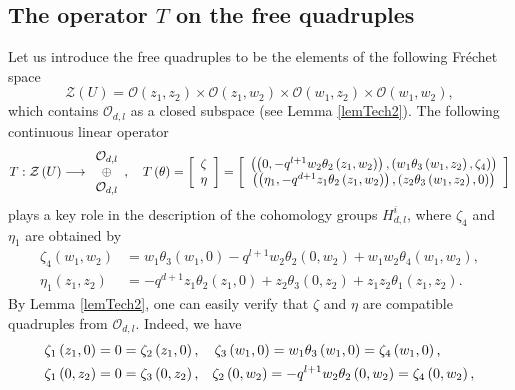\documentclass[12pt,reqno]{amsart}%
\theoremstyle{plain}
\numberwithin{theorem}{section} \numberwithin{equation}{section}
\numberwithin{lemma}{section}
\numberwithin{remark}{section}
\numberwithin{example}{section}
\numberwithin{proposition}{section}
\numberwithin{definition}{section}
\numberwithin{corollary}{section}
\begin{document}
\subsection{The operator $T$ on the free quadruples\label{subsecOT}}

Let us introduce the free quadruples to be the elements of the following
Fr\'{e}chet space
\[
\mathcal{Z}\left(  U\right)  =\mathcal{O}\left(  z_{1},z_{2}\right)
\times\mathcal{O}\left(  z_{1},w_{2}\right)  \times\mathcal{O}\left(
w_{1},z_{2}\right)  \times\mathcal{O}\left(  w_{1},w_{2}\right)  ,
\]
which contains $\mathcal{O}_{d,l}$ as a closed subspace (see Lemma
\ref{lemTech2}). The following continuous linear operator
\[
T:\mathcal{Z}\left(  U\right)  \longrightarrow%
\begin{array}
[c]{c}%
\mathcal{O}_{d,l}\\
\oplus\\
\mathcal{O}_{d,l}%
\end{array}
,\quad T\left(  \theta\right)  =\left[
\begin{array}
[c]{c}%
\zeta\\
\eta
\end{array}
\right]  =\left[
\begin{array}
[c]{c}%
\left(  \left(  0,-q^{l+1}w_{2}\theta_{2}\left(  z_{1},w_{2}\right)  \right)
,\left(  w_{1}\theta_{3}\left(  w_{1},z_{2}\right)  ,\zeta_{4}\right)  \right)
\\
\left(  \left(  \eta_{1},-q^{d+1}z_{1}\theta_{2}\left(  z_{1},w_{2}\right)
\right)  ,\left(  z_{2}\theta_{3}\left(  w_{1},z_{2}\right)  ,0\right)
\right)
\end{array}
\right]
\]
plays a key role in the description of the cohomology groups $H_{d,l}^{i}$,
where $\zeta_{4}$ and $\eta_{1}$ are obtained by
\begin{align*}
\zeta_{4}\left(  w_{1},w_{2}\right)   &  =w_{1}\theta_{3}\left(
w_{1},0\right)  -q^{l+1}w_{2}\theta_{2}\left(  0,w_{2}\right)  +w_{1}%
w_{2}\theta_{4}\left(  w_{1},w_{2}\right)  ,\\
\eta_{1}\left(  z_{1},z_{2}\right)   &  =-q^{d+1}z_{1}\theta_{2}\left(
z_{1},0\right)  +z_{2}\theta_{3}\left(  0,z_{2}\right)  +z_{1}z_{2}\theta
_{1}\left(  z_{1},z_{2}\right)  .
\end{align*}
By Lemma \ref{lemTech2}, one can easily verify that $\zeta$ and $\eta$ are
compatible quadruples from $\mathcal{O}_{d,l}$. Indeed, we have
\begin{align*}
\zeta_{1}\left(  z_{1},0\right)   &  =0=\zeta_{2}\left(  z_{1},0\right)
,\quad\zeta_{3}\left(  w_{1},0\right)  =w_{1}\theta_{3}\left(  w_{1},0\right)
=\zeta_{4}\left(  w_{1},0\right)  \text{, }\\
\zeta_{1}\left(  0,z_{2}\right)   &  =0=\zeta_{3}\left(  0,z_{2}\right)
\text{,\quad}\zeta_{2}\left(  0,w_{2}\right)  =-q^{l+1}w_{2}\theta_{2}\left(
0,w_{2}\right)  =\zeta_{4}\left(  0,w_{2}\right)  ,
\end{align*}%
\end{document}
